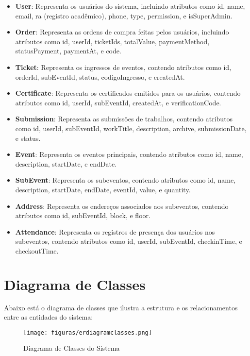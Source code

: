 \begin{itemize}
\begin{description}
\begin{itemize}
    \item \textbf{User}: Representa os usuários do sistema, incluindo atributos como id, name, email, ra (registro acadêmico), phone, type, permission, e isSuperAdmin.
    \item \textbf{Order}: Representa as ordens de compra feitas pelos usuários, incluindo atributos como id, userId, ticketIds, totalValue, paymentMethod, statusPayment, paymentAt, e code.
    \item \textbf{Ticket}: Representa os ingressos de eventos, contendo atributos como id, orderId, subEventId, status, codigoIngresso, e createdAt.
    \item \textbf{Certificate}: Representa os certificados emitidos para os usuários, contendo atributos como id, userId, subEventId, createdAt, e verificationCode.
    \item \textbf{Submission}: Representa as submissões de trabalhos, contendo atributos como id, userId, subEventId, workTitle, description, archive, submissionDate, e status.
    \item \textbf{Event}: Representa os eventos principais, contendo atributos como id, name, description, startDate, e endDate.
    \item \textbf{SubEvent}: Representa os subeventos, contendo atributos como id, name, description, startDate, endDate, eventId, value, e quantity.
    \item \textbf{Address}: Representa os endereços associados aos subeventos, contendo atributos como id, subEventId, block, e floor.
    \item \textbf{Attendance}: Representa os registros de presença dos usuários nos subeventos, contendo atributos como id, userId, subEventId, checkinTime, e checkoutTime.
\end{itemize}

\section{Diagrama de Classes}

Abaixo está o diagrama de classes que ilustra a estrutura e os relacionamentos entre as entidades do sistema:

\begin{figure}[h]
\centering
\texttt{[image: figuras/erdiagramclasses.png]}
\caption{Diagrama de Classes do Sistema}
\label{fig:diagrama-classes}
\end{figure}


\end{description}
\end{itemize}
